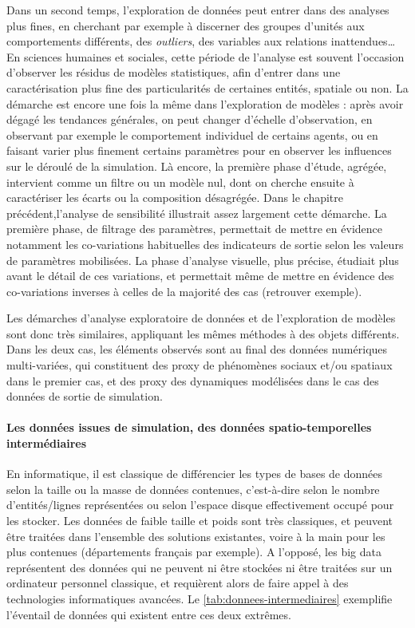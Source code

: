 \noindent Dans un second temps, l'exploration de données peut entrer dans des analyses plus fines, en cherchant par exemple à discerner des groupes d'unités aux comportements différents, des \textit{outliers}, des variables aux relations inattendues\ldots
En sciences humaines et sociales, cette période de l'analyse est souvent l'occasion d'observer les résidus de modèles statistiques, afin d'entrer dans une caractérisation plus fine des particularités de certaines entités, spatiale ou non.
La démarche est encore une fois la même dans l'exploration de modèles :
	après avoir dégagé les tendances générales, on peut changer d'échelle d'observation, en observant par exemple le comportement individuel de certains agents, ou en faisant varier plus finement certains paramètres pour en observer les influences sur le déroulé de la simulation.
Là encore, la première phase d'étude, agrégée, intervient comme un filtre ou un modèle nul, dont on cherche ensuite à caractériser les écarts ou la composition désagrégée.
Dans le chapitre précédent,l'analyse de sensibilité illustrait assez largement cette démarche.
La première phase, de filtrage des paramètres, permettait de mettre en évidence notamment les co-variations habituelles des indicateurs de sortie selon les valeurs de paramètres mobilisées.
La phase d'analyse visuelle, plus précise, étudiait plus avant le détail de ces variations, et permettait même de mettre en évidence des co-variations inverses à celles de la majorité des cas (retrouver exemple).

\noindent Les démarches d'analyse exploratoire de données et de l'exploration de modèles sont donc très similaires, appliquant les mêmes méthodes à des objets différents.
Dans les deux cas, les éléments observés sont au final des données numériques multi-variées, qui constituent des proxy de phénomènes sociaux et/ou spatiaux dans le premier cas, et des proxy des dynamiques modélisées dans le cas des données de sortie de simulation.

\paragraph{Les données issues de simulation, des données spatio-temporelles \og \og intermédiaires\fg{}}
En informatique, il est classique de différencier les types de bases de données selon la \og taille\fg{} ou la masse de données contenues, c'est-à-dire selon le nombre d'entités/lignes représentées ou selon l'espace disque effectivement occupé pour les stocker.
Les données de faible taille et poids sont très classiques, et peuvent être traitées dans l'ensemble des solutions existantes, voire à la main pour les plus contenues (départements français par exemple).
A l'opposé, les \og big data\fg{} représentent des données qui ne peuvent ni être stockées ni être traitées sur un ordinateur personnel classique, et requièrent alors de faire appel à des technologies informatiques avancées.
Le \cref{tab:donnees-intermediaires} exemplifie l'éventail de données qui existent entre ces deux extrêmes.

